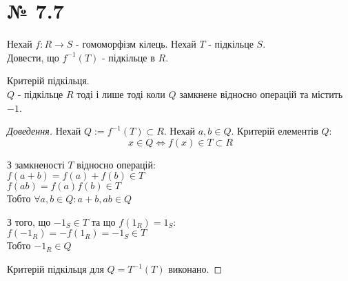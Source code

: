 \documentclass[11pt, a4paper]{article} %
\begin{document}
\section*{№ 7.7}
\begin{mdframed}
    Нехай $f : R \to S$ - гомоморфізм кілець.
    Нехай $T$ - підкільце $S$.\\
    Довести, що $f^{-1}(T)$ - підкільце в $R$.
\end{mdframed}

\begin{mdframed}[backgroundcolor=purple!20]
    Критерій підкільця.\\
    $Q$ - підкільце $R$ тоді і лише тоді коли $Q$ замкнене відносно операцій та містить $-1$.
\end{mdframed}

\begin{proof}[Доведення]
Нехай $Q := f^{-1}(T) \subset R$.
Нехай $a,b \in Q$.
Критерій елементів $Q$:
\[x \in Q \iff f(x)\in T \subset R\]

З замкненості $T$ відносно операцій:\\
$f(a+b) = f(a)+f(b) \in T$\\
$f(ab) = f(a)f(b) \in T$\\
Тобто $\forall a,b \in Q: a+b, ab \in Q$

З того, що $-1_S \in T$ та що $f(1_R) = 1_S$:\\
$f(-1_R) = -f(1_R) = -1_S \in T$\\
Тобто $-1_R \in Q$

Критерій підкільця для $Q = T^{-1}(T)$ виконано.
\end{proof}
\end{document}
